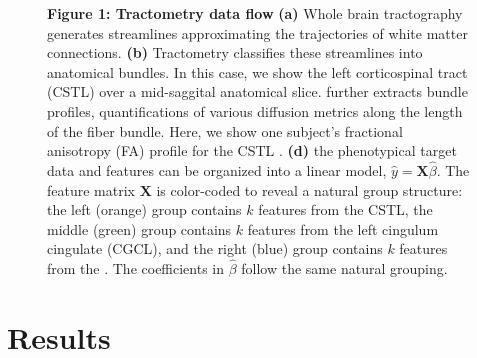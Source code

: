 \documentclass[10pt,letterpaper]{article}
\begin{document}
\begin{figure}[b!]
    {\label{fig:methods:tractogram}}
    {\label{fig:methods:cst}}
    {\label{fig:methods:tract-profile:cst}}
    {\label{fig:methods:tract-profile:fa}}
    {\label{fig:methods:group-structure}}
    \caption{\label{fig:methods}
    {\bf Figure 1: Tractometry data flow}
    \textbf{(a)} Whole brain tractography generates streamlines approximating
        the trajectories of white matter connections.
        \textbf{(b)} Tractometry classifies these streamlines into anatomical bundles.
        In this case, we show the left corticospinal tract (CSTL)
        over a mid-saggital anatomical slice.
          further extracts bundle profiles,
        quantifications of various diffusion metrics along the length of the
        fiber bundle. Here, we show one subject's fractional anisotropy (FA)
        profile for  the CSTL .
        \textbf{(d)} the phenotypical target data and 
        features can be organized into a linear model, $\hat{y} = \mathbf{X}
        \hat{\beta}$. The feature matrix $\mathbf{X}$ is color-coded
        to reveal a natural group structure: the left (orange) group
        contains $k$ features from the CSTL, the middle (green) group
        contains $k$ features from the left cingulum cingulate (CGCL),
        and the right (blue) group
        contains $k$ features from the .
        The coefficients in $\hat{\beta}$ follow the same natural grouping. 
    }
\end{figure}


\section*{Results}
\end{document}
